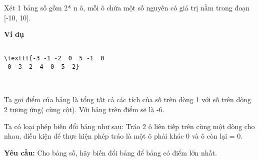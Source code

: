 Xét 1 bảng số gồm 2* n ô, mỗi ô chứa một số nguyên có giá trị nằm trong đoạn [-10, 10].

\textbf{Ví dụ }
\begin{verbatim}

\texttt{-3 -1 -2  0  5 -1  0
 0 -3  2  4  0  5 -2}\end{verbatim}

 

Ta gọi điểm của bảng là tổng tất cả các tích của số trên dòng 1 với số trên dòng 2 tương ứng( cùng cột). Với bảng trên điểm sẽ là -6.

Ta có loại phép biến đổi bảng như sau: Tráo 2 ô liên tiếp trên cùng một dòng cho nhau, điều kiện để thực hiện phép tráo là một ô phải khác 0 và ô còn lại = 0.

\textbf{Yêu cầu: } Cho bảng số, hãy biến đổi bảng để bảng có điểm lớn nhất.

\